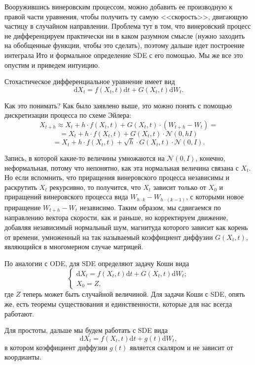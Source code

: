 \documentclass[12pt]{article}
\theoremstyle{definition}
\begin{document}
Вооружившись винеровским процессом, можно добавить ее производную к правой части уравнения, чтобы получить ту самую <<скорость>>, двигающую частицу в случайном направлении. Проблема тут в том, что винеровский процесс не дифференцируем практически ни в каком разумном смысле (нужно заходить на обобщенные функции, чтобы это сделать), поэтому дальше идет построение интеграла Ито и формальное определение SDE с его помощью. Мы же все это опустим и приведем интуицию.

Стохастическое дифференциальное уравнение имеет вид
\[
    \mathrm{d} X_t = f(X_t, t) \mathrm{d} t + G(X_t, t) \mathrm{d} W_t.
\]

Как это понимать? Как было заявлено выше, это можно понять с помощью дискретизации процесса по схеме Эйлера:
\[
    X_{t + h} \approx X_t + h \cdot f(X_t, t) + G(X_t, t) \cdot (W_{t + h} - W_t) = 
\]
\[
    = X_t + h \cdot f(X_t, t) + G(X_t, t) \cdot \mathcal{N}(0, h I)
\]
\[
    = X_t + h \cdot f(X_t, t) + \sqrt{h} \cdot G(X_t, t) \cdot \mathcal{N}(0, I).
\]

Запись, в которой какие-то величины умножаются на $\mathcal{N}(0, I)$, конечно, неформальная, потому что непонятно, как эта нормальная величина связана с $X_t$. Но если вспомнить, что приращения винеровского процесса независимы и раскрутить $X_t$ рекурсивно, то получится, что $X_t$ зависит только от $X_0$ и приращений винеровского процесса вида $W_{h \cdot k} - W_{h \cdot (k - 1)}$, с которыми новое приращение $W_{t + h} - W_t$ независимо.
Таким образом, мы сдвигаемся по направлению вектора скорости, как и раньше, но корректируем движение, добавляя независимый нормальный шум, магнитуда которого зависит как корень от времени, умноженный на так называемый коэффициент диффузии $G(X_t, t)$, являющийся в многомерном случае матрицей.

По аналогии с ODE, для SDE определяют задачу Коши вида 
\[
    \begin{cases}
        \mathrm{d} X_t = f(X_t, t) \mathrm{d} t + G(X_t, t) \mathrm{d} W_t;\\
        X_0 = Z,
    \end{cases}
\]
где $Z$ теперь может быть случайной величиной. Для задачи Коши с SDE, опять же, есть теоремы существования и единственности, которые для нас всегда работают.

Для простоты, дальше мы будем работать с SDE вида
\[
    \mathrm{d} X_t = f(X_t, t) \mathrm{d} t + g(t) \mathrm{d} W_t,
\]
в котором коэффициент диффузии $g(t)$ является скаляром и не зависит от коордианты.
\end{document}
